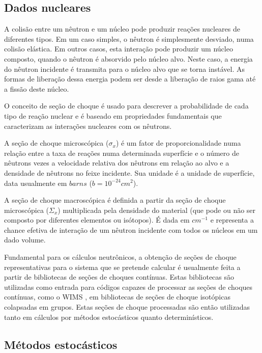\subsection{Dados nucleares}
\label{subsec:dn}

A colisão entre um nêutron e um núcleo pode produzir reações nucleares de diferentes
tipos. Em um caso simples, o nêutron é simplesmente desviado, numa colisão elástica.
Em outros casos, esta interação pode produzir um núcleo composto, quando o nêutron é
absorvido pelo núcleo alvo. Neste caso, a energia do nêutron incidente é transmita para
o núcleo alvo que se torna instável. As formas de liberação dessa energia podem ser desde
a liberação de raios gama até a fissão deste núcleo.

O conceito de seção de choque \cite{Hebert2009} é usado para descrever a probabilidade
de cada tipo de reação nuclear e é baseado em propriedades fundamentais que caracterizam
as interações nucleares com os nêutrons.

A seção de choque microscópica ($\sigma_x$) é um fator de proporcionalidade numa relação entre
a taxa de reações numa determinada superfície e o número de nêutrons vezes a velocidade
relativa dos nêutrons em relação ao alvo e a densidade de nêutrons no feixe incidente.
Sua unidade é a unidade de superfície, data usualmente em $barns$ ($b=10^{-24}cm^2$).

A seção de choque macroscópica é definida a partir da seção de choque microscópica ($\Sigma_x$)
multiplicada pela densidade do material (que pode ou não ser composto por diferentes elementos ou
isótopos). É dada em $cm^{-1}$ e representa a chance efetiva de interação de um nêutron incidente
com todos os núcleos em um dado volume.

Fundamental para os cálculos neutrônicos, a obtenção de seções de choque representativas para
o sistema que se pretende calcular é usualmente feita a partir de bibliotecas de seções de choques
contínuas. Estas bibliotecas são utilizadas como entrada para códigos capazes de processar
as seções de choques contínuas, como o WIMS \cite{Halsall1986},
em bibliotecas de seções de choque isotópicas colapsadas em grupos.
Estas seções de choque processadas são então utilizadas tanto em cálculos por métodos
estocásticos quanto determinísticos.


\subsection{Métodos estocásticos}
\label{subsec:mc}

